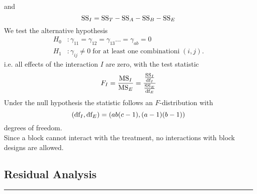 and
\begin{equation}
  \textup{SS}_I = \textup{SS}_T - \textup{SS}_A - \textup{SS}_B - \textup{SS}_E
\end{equation}
We test the alternative hypothesis
\begin{equation}
  \begin{split}
    H_0 &: \gamma_{11} = \gamma_{12} = \gamma_{13} \dots = \gamma_{ab} = 0\;\\
    H_1 &: \gamma_{ij} \neq 0 \;\text{for at least one combinationi}\;(i,j).
  \end{split}
\end{equation}
i.e. all effects of the interaction $I$ are zero, with the test statistic
\begin{equation}
  F_I = \frac{\textup{MS}_I}{\textup{MS}_E} = \frac{\frac{\textup{SS}_I}{\textup{df}_I}}{\frac{\textup{SS}_E}{\textup{df}_E}}
\end{equation}
Under the null hypothesis the statistic follows an $F$-distribution with
\begin{equation}
  (\textup{df}_I , \textup{df}_E) = (ab(c - 1),(a - 1)(b - 1))
\end{equation}
degrees of freedom.\\
Since a block cannot interact with the treatment, no interactions with block designs are allowed.\\

\subsection{Residual Analysis}
\noindent\rule[\linienAbstand]{\linewidth}{\linienDicke}
